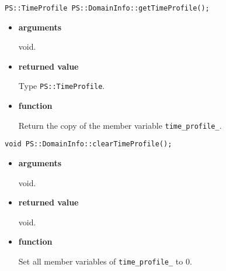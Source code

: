 \begin{screen}
\begin{verbatim}
PS::TimeProfile PS::DomainInfo::getTimeProfile();
\end{verbatim}
\end{screen}

\begin{itemize}

\item {\bf arguments}

void.

\item {\bf returned value}

Type \texttt{PS::TimeProfile}.

\item {\bf function}

Return the copy of the member variable {\tt time\_profile\_}.


\end{itemize}

\begin{screen}
\begin{verbatim}
void PS::DomainInfo::clearTimeProfile();
\end{verbatim}
\end{screen}

\begin{itemize}

\item {\bf arguments}

void.

\item {\bf returned value}

void.

\item {\bf function}

Set all member variables of {\tt time\_profile\_} to 0.


\end{itemize}


